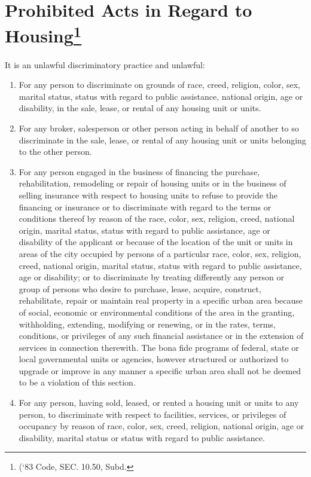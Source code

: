 \section{Prohibited Acts in Regard to Housing\footnote{(‘83 Code, SEC. 10.50, Subd.}}
It is an unlawful discriminatory practice and unlawful:
\begin{enumerate}[{\indent}A)]
    \item For any person to discriminate on grounds of race, creed, religion, color, sex, marital status, status with regard to public assistance, national origin, age or disability, in the sale, lease, or rental of any housing unit or units.
    \item For any broker, salesperson or other person acting in behalf of another to so discriminate in the sale, lease, or rental of any housing unit or units belonging to the other person.
    \item For any person engaged in the business of financing the purchase, rehabilitation, remodeling or repair of housing units or in the business of selling insurance with respect to housing units to refuse to provide the financing or insurance or to discriminate with regard to the terms or conditions thereof by reason of the race, color, sex, religion, creed, national origin, marital status, status with regard to public assistance, age or disability of the applicant or because of the location of the unit or units in areas of the city occupied by persons of a particular race, color, sex, religion, creed, national origin, marital status, status with regard to public assistance, age or disability; or to discriminate by treating differently any person or group of persons who desire to purchase, lease, acquire, construct, rehabilitate, repair or maintain real property in a specific urban area because of social, economic or environmental conditions of the area in the granting, withholding, extending, modifying or renewing, or in the rates, terms, conditions, or privileges of any such financial assistance or in the extension of services in connection therewith.  The bona fide programs of federal, state or local governmental units or agencies, however structured or authorized to upgrade or improve in any manner a specific urban area shall not be deemed to be a violation of this section.
    \item For any person, having sold, leased, or rented a housing unit or units to any person, to discriminate with respect to facilities, services, or privileges of occupancy by reason of race, color, sex, creed, religion, national origin, age or disability, marital status or status with regard to public assistance.

\end{enumerate}
